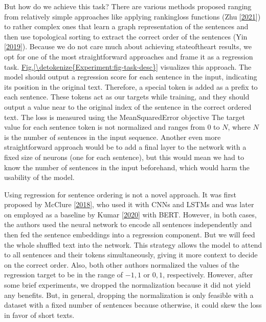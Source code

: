 \documentclass[letterpaper,10pt,english]{jupyterBook}
\begin{document}
\sphinxAtStartPar
But how do we achieve this task?
There are various methods proposed ranging from relatively simple approaches like applying ranking\sphinxhyphen{}loss functions (Zhu  {[}\hyperlink{cite.Bibliography:id7}{2021}{]}) to rather complex ones that learn a graph representation of the sentences and then use topological sorting to extract the correct order of the sentences (Yin  {[}\hyperlink{cite.Bibliography:id6}{2019}{]}).
Because we do not care much about achieving state\sphinxhyphen{}of\sphinxhyphen{}the\sphinxhyphen{}art results, we opt for one of the most straightforward approaches and frame it as a regression task.
\hyperref[\detokenize{Experiment:fig-task-desc}]{Fig.\@ \ref{\detokenize{Experiment:fig-task-desc}}} visualizes this approach.
The model should output a regression score for each sentence in the input, indicating its position in the original text.
Therefore, a special token is added as a prefix to each sentence. These tokens act as our targets while training, and they should output a value near to the original index of the sentence in the correct ordered text.
The loss is measured using the Mean\sphinxhyphen{}Squared\sphinxhyphen{}Error objective
The target value for each sentence token is not normalized and ranges from 0 to \(N\), where \(N\) is the number of sentences in the input sequence.
Another even more straightforward approach would be to add a final layer to the network with a fixed size of neurons (one for each sentence), but this would mean we had to know the number of sentences in the input beforehand, which would harm the usability of the model.

\sphinxAtStartPar
Using regression for sentence ordering is not a novel approach.
It was first proposed by McClure  {[}\hyperlink{cite.Bibliography:id8}{2018}{]}, who used it with CNNs and LSTMs and was later on employed as a baseline by Kumar  {[}\hyperlink{cite.Bibliography:id9}{2020}{]} with BERT.
However, in both cases, the authors used the neural network to encode all sentences independently and then fed the sentence embeddings into a regression component.
But we will feed the whole shuffled text into the network. This strategy allows the model to attend to all sentences and their tokens simultaneously, giving it more context to decide on the correct order.
Also, both other authors normalized the values of the regression target to be in the range of \(-1,1\) or \(0,1\), respectively. However, after some brief experiments, we dropped the normalization because it did not yield any benefits. But, in general, dropping the normalization is only feasible with a dataset with a fixed number of sentences because otherwise, it could skew the loss in favor of short texts.
\end{document}
